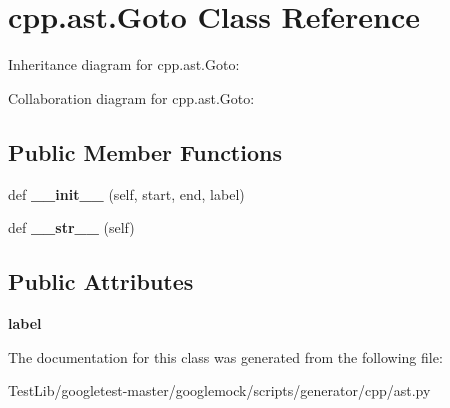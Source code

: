 \hypertarget{classcpp_1_1ast_1_1Goto}{}\section{cpp.\+ast.\+Goto Class Reference}
\label{classcpp_1_1ast_1_1Goto}


Inheritance diagram for cpp.\+ast.\+Goto\+:


Collaboration diagram for cpp.\+ast.\+Goto\+:
\subsection*{Public Member Functions}
\begin{DoxyCompactItemize}
\item 
\mbox{\label{classcpp_1_1ast_1_1Goto_a928e79374a90d01fc060985ea1e45260}} 
def {\bfseries \+\_\+\+\_\+init\+\_\+\+\_\+} (self, start, end, label)
\item 
\mbox{\label{classcpp_1_1ast_1_1Goto_a508b6bc091cf06bfed73a33368c236c9}} 
def {\bfseries \+\_\+\+\_\+str\+\_\+\+\_\+} (self)
\end{DoxyCompactItemize}
\subsection*{Public Attributes}
\begin{DoxyCompactItemize}
\item 
\mbox{\label{classcpp_1_1ast_1_1Goto_a685284ea5f3b21f39aff7f5db841c8f5}} 
{\bfseries label}
\end{DoxyCompactItemize}


The documentation for this class was generated from the following file\+:\begin{DoxyCompactItemize}
\item 
Test\+Lib/googletest-\/master/googlemock/scripts/generator/cpp/ast.\+py\end{DoxyCompactItemize}
